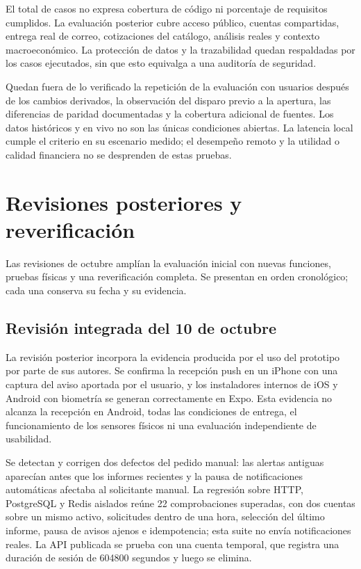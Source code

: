El total de casos no expresa cobertura de código ni porcentaje de requisitos cumplidos. La evaluación posterior cubre acceso público, cuentas compartidas, entrega real de correo, cotizaciones del catálogo, análisis reales y contexto macroeconómico. La protección de datos y la trazabilidad quedan respaldadas por los casos ejecutados, sin que esto equivalga a una auditoría de seguridad.

Quedan fuera de lo verificado la repetición de la evaluación con usuarios después de los cambios derivados, la observación del disparo previo a la apertura, las diferencias de paridad documentadas y la cobertura adicional de fuentes. Los datos históricos y en vivo no son las únicas condiciones abiertas. La latencia local cumple el criterio en su escenario medido; el desempeño remoto y la utilidad o calidad financiera no se desprenden de estas pruebas.


\section{Revisiones posteriores y reverificación}\label{sec:revisiones-posteriores}

Las revisiones de octubre amplían la evaluación inicial con nuevas funciones, pruebas físicas y una reverificación completa. Se presentan en orden cronológico; cada una conserva su fecha y su evidencia.

\subsection{Revisión integrada del 10 de octubre}\label{sec:revision-octubre10}

La revisión posterior incorpora la evidencia producida por el uso del prototipo por parte de sus autores. Se confirma la recepción push en un iPhone con una captura del aviso aportada por el usuario, y los instaladores internos de iOS y Android con biometría se generan correctamente en Expo. Esta evidencia no alcanza la recepción en Android, todas las condiciones de entrega, el funcionamiento de los sensores físicos ni una evaluación independiente de usabilidad.

Se detectan y corrigen dos defectos del pedido manual: las alertas antiguas aparecían antes que los informes recientes y la pausa de notificaciones automáticas afectaba al solicitante manual. La regresión sobre HTTP, PostgreSQL y Redis aislados reúne 22 comprobaciones superadas, con dos cuentas sobre un mismo activo, solicitudes dentro de una hora, selección del último informe, pausa de avisos ajenos e idempotencia; esta suite no envía notificaciones reales. La API publicada se prueba con una cuenta temporal, que registra una duración de sesión de 604800 segundos y luego se elimina.

